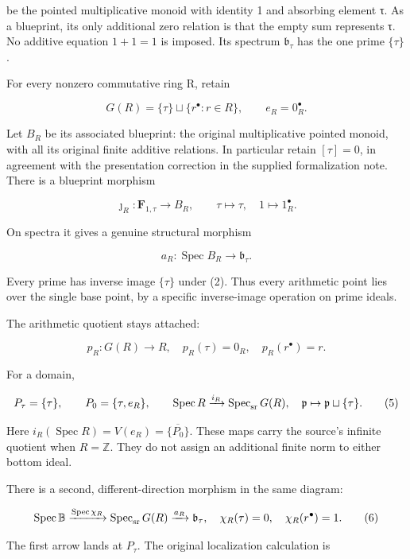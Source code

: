 \documentclass[
]{article}
\begin{document}
be the pointed multiplicative monoid with identity 1 and absorbing
element τ. As a blueprint, its only additional zero relation is that the
empty sum represents τ. No additive equation \(1+1=1\) is imposed. Its
spectrum \(\mathfrak b_\tau\) has the one prime \(\{\tau\}\).

For every nonzero commutative ring R, retain

\[
G(R)=\{\tau\}\sqcup\{r^\bullet:r\in R\},\qquad e_R=0_R^\bullet.
\tag{1}
\]

Let \(B_R\) be its associated blueprint: the original multiplicative
pointed monoid, with all its original finite additive relations. In
particular retain \([\tau]=0\), in agreement with the presentation
correction in the supplied formalization note. There is a blueprint
morphism

\[
\jmath_R:\mathbf F_{1,\tau}\longrightarrow B_R,
\qquad \tau\mapsto\tau,\quad1\mapsto1_R^\bullet.
\tag{2}
\]

On spectra it gives a genuine structural morphism

\[
a_R:\operatorname{Spec}B_R\longrightarrow\mathfrak b_\tau.
\tag{3}
\]

Every prime has inverse image \(\{\tau\}\) under (2). Thus every
arithmetic point lies over the single base point, by a specific
inverse-image operation on prime ideals.

The arithmetic quotient stays attached:

\[
p_R:G(R)\longrightarrow R,
\quad p_R(\tau)=0_R,\quad p_R(r^\bullet)=r.
\tag{4}
\]

For a domain,

\[
P_\tau=\{\tau\},\qquad P_0=\{\tau,e_R\},\qquad
\operatorname{Spec}R\xrightarrow{i_R}\operatorname{Spec}_{\rm sr}G(R),
\quad\mathfrak p\mapsto\mathfrak p\sqcup\{\tau\}.
\tag{5}
\]

Here \(i_R(\operatorname{Spec}R)=V(e_R)=\overline{\{P_0\}}\). These maps
carry the source's infinite quotient when \(R=\mathbb Z\). They do not
assign an additional finite norm to either bottom ideal.

There is a second, different-direction morphism in the same diagram:

\[
\operatorname{Spec}\mathbb B\xrightarrow{\operatorname{Spec}\chi_R}
\operatorname{Spec}_{\rm sr}G(R)\xrightarrow{a_R}\mathfrak b_\tau,
\quad
\chi_R(\tau)=0,\quad\chi_R(r^\bullet)=1.
\tag{6}
\]

The first arrow lands at \(P_\tau\). The original localization
calculation is
\end{document}

